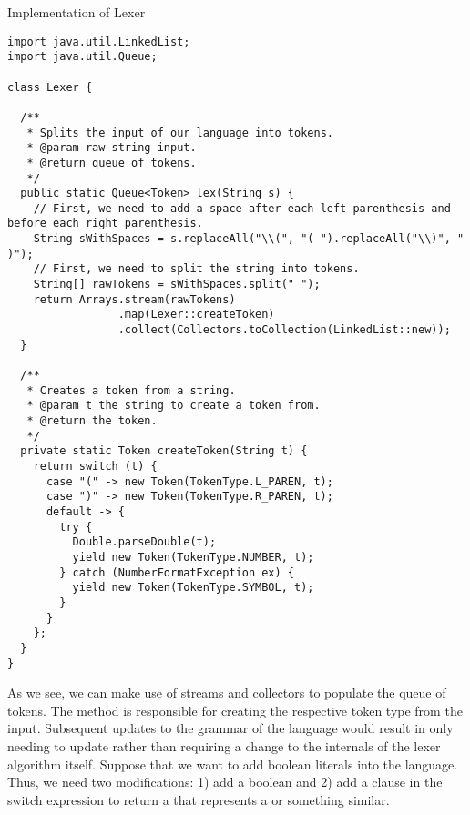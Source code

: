 \begin{cl}{Implementation of Lexer}
\begin{lstlisting}[language=MyJava]
import java.util.LinkedList;
import java.util.Queue;

class Lexer {

  /**
   * Splits the input of our language into tokens.
   * @param raw string input.
   * @return queue of tokens.
   */
  public static Queue<Token> lex(String s) {
    // First, we need to add a space after each left parenthesis and before each right parenthesis.
    String sWithSpaces = s.replaceAll("\\(", "( ").replaceAll("\\)", " )");
    // First, we need to split the string into tokens.
    String[] rawTokens = sWithSpaces.split(" ");
    return Arrays.stream(rawTokens)
                 .map(Lexer::createToken)
                 .collect(Collectors.toCollection(LinkedList::new));
  }

  /**
   * Creates a token from a string.
   * @param t the string to create a token from.
   * @return the token.
   */
  private static Token createToken(String t) {
    return switch (t) {
      case "(" -> new Token(TokenType.L_PAREN, t);
      case ")" -> new Token(TokenType.R_PAREN, t);
      default -> {
        try {
          Double.parseDouble(t);
          yield new Token(TokenType.NUMBER, t);
        } catch (NumberFormatException ex) {
          yield new Token(TokenType.SYMBOL, t);
        }
      }
    };
  }
}
\end{lstlisting}
\end{cl}

As we see, we can make use of streams and collectors to populate the queue of tokens. The  method is responsible for creating the respective token type from the input. Subsequent updates to the grammar of the language would result in only needing to update  rather than requiring a change to the internals of the lexer algorithm itself. Suppose that we want to add boolean literals into the language. Thus, we need two modifications: 1) add a boolean  and 2) add a clause in the switch expression to return a  that represents a  or something similar.



